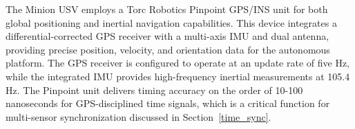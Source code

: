 \documentclass{erauthesis}
\begin{document}
The Minion \ac{USV} employs a Torc Robotics Pinpoint \ac{GPS}/\ac{INS} unit for both global positioning and inertial navigation capabilities.
This device integrates a differential-corrected \ac{GPS} receiver with a multi-axis \ac{IMU} and dual antenna, providing precise position, velocity, and orientation data for the autonomous platform.
The \ac{GPS} receiver is configured to operate at an update rate of five Hz, while the integrated \ac{IMU} provides high-frequency inertial measurements at 105.4 Hz.
The Pinpoint unit delivers timing accuracy on the order of 10-100 nanoseconds for \ac{GPS}-disciplined time signals, which is a critical function for multi-sensor synchronization discussed in Section~\ref{time_sync}.



\end{document}

